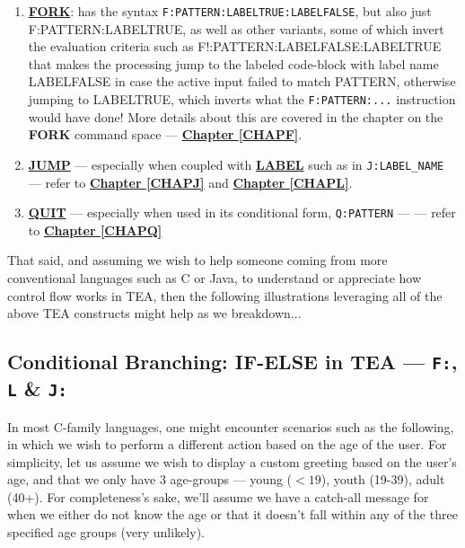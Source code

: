 \documentclass[a4paper, 18pt]{book} %
\begin{document}
{{{\begin{appendices}
\begin{enumerate}
\item \textbf{\hyperref[CHAPF]{FORK}}: has the syntax \texttt{F:PATTERN:LABELTRUE:LABELFALSE}, but also just {F:PATTERN:LABELTRUE}, as well as other variants, some of which invert the evaluation criteria such as {F!:PATTERN:LABELFALSE:LABELTRUE} that makes the processing jump to the labeled code-block with label name LABELFALSE in case the active input failed to match PATTERN, otherwise jumping to LABELTRUE, which inverts what the \texttt{F:PATTERN:...} instruction would have done! More details about this are covered in the chapter on the \textbf{FORK} command space --- \textbf{\hyperref[CHAPF]{Chapter \ref{CHAPF}}}.

\item \textbf{\hyperref[CHAPJ]{JUMP}} --- especially when coupled with \textbf{\hyperref[CHAPL]{LABEL}} such as in \texttt{J:LABEL\_NAME} --- refer to \textbf{\hyperref[CHAPJ]{Chapter \ref{CHAPJ}}} and \textbf{\hyperref[CHAPL]{Chapter \ref{CHAPL}}}.

\item \textbf{\hyperref[CHAPQ]{QUIT}} --- especially when used in its conditional form, \texttt{Q:PATTERN} ---  --- refer to \textbf{\hyperref[CHAPQ]{Chapter \ref{CHAPQ}}}
\end{enumerate}


That said, and assuming we wish to help someone coming from more conventional languages such as C or Java, to understand or appreciate how control flow works in TEA, then the following illustrations leveraging all of the above TEA constructs might help as we breakdown...


\subsection{Conditional Branching: IF-ELSE in TEA --- \texttt{F:}, \texttt{L} \& \texttt{J:}}
\label{LEARNTEATOPICCF_CON_BRA}

In most C-family languages, one might encounter scenarios such as the following, in which we wish to perform a different action based on the age of the user. For simplicity, let us assume we wish to display a custom greeting based on the user's age, and that we only have 3 age-groups --- young ($<19$), youth (19-39), adult (40+). For completeness's sake, we'll assume we have a catch-all message for when we either do not know the age or that it doesn't fall within any of the three specified age groups (very unlikely).


\end{appendices}}}}
\end{document}
